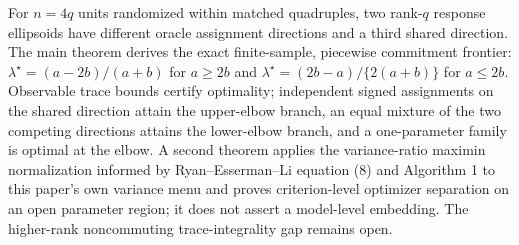 For \(n=4q\) units randomized within matched quadruples, two rank-\(q\) response ellipsoids have different oracle assignment directions and a third shared direction. The main theorem derives the exact finite-sample, piecewise commitment frontier: \(\lambda^\star=(a-2b)/(a+b)\) for \(a\ge2b\) and \(\lambda^\star=(2b-a)/\{2(a+b)\}\) for \(a\le2b\). Observable trace bounds certify optimality; independent signed assignments on the shared direction attain the upper-elbow branch, an equal mixture of the two competing directions attains the lower-elbow branch, and a one-parameter family is optimal at the elbow. A second theorem applies the variance-ratio maximin normalization informed by Ryan--Esserman--Li equation (8) and Algorithm 1 to this paper's own variance menu and proves criterion-level optimizer separation on an open parameter region; it does not assert a model-level embedding. The higher-rank noncommuting trace-integrality gap remains open.
